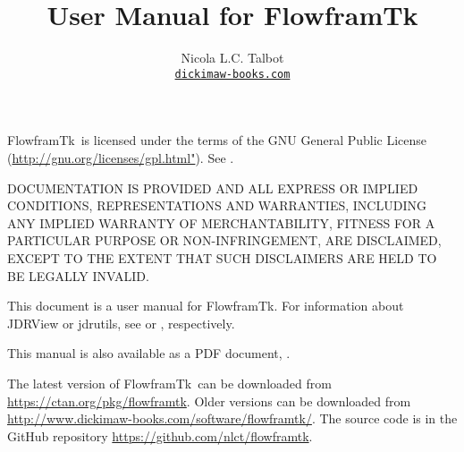 \newcommand*{\typedef}[1]{\inlineglsdef{ajdr-format.#1}}
\newcommand*{\type}[1]{\gls{ajdr-format.#1}}
\newcommand*{\typepl}[1]{\glspl{ajdr-format.#1}}


%
{}
{}


\subtitle{\bigskip{}\bigskip}


\GlsXtrLoadResources[src={flowframtk,shared,\langbibsrcs},
 \TeXJavaHelpSymbolResourceOptions
]

\GlsXtrLoadResources[src={flowframtk,shared,\langbibsrcs},
 \TeXJavaHelpGlsResourceOptions
]

\providecommand{\FlowframTk}{FlowframTk}

\title{User Manual for \FlowframTk}
\author{Nicola L.C. Talbot\\\href{https://www.dickimaw-books.com/}{\nolinkurl{dickimaw-books.com}}}


\maketitle

\FlowframTk\ is licensed under the terms of the GNU General Public License
(\url{http://gnu.org/licenses/gpl.html"}).
See .

DOCUMENTATION IS PROVIDED  AND ALL EXPRESS OR IMPLIED
CONDITIONS, REPRESENTATIONS AND WARRANTIES, INCLUDING ANY
IMPLIED WARRANTY OF MERCHANTABILITY, FITNESS FOR A PARTICULAR
PURPOSE OR NON-INFRINGEMENT, ARE DISCLAIMED, EXCEPT TO THE EXTENT THAT
SUCH DISCLAIMERS ARE HELD TO BE LEGALLY INVALID.

This document is a user manual for \FlowframTk. For information about
JDRView or jdrutils, see  or
, respectively.

\IfTeXParserLib
  {%
    This manual is also available as a PDF document, . 
  }
  {}

The latest version of \FlowframTk\ can be downloaded from
\url{https://ctan.org/pkg/flowframtk}.
Older versions can be downloaded from
\url{http://www.dickimaw-books.com/software/flowframtk/}.
The source code is in the GitHub repository
\url{https://github.com/nlct/flowframtk}.

